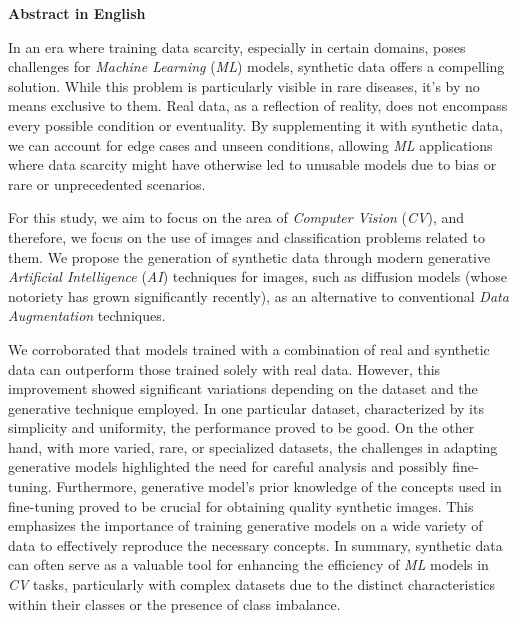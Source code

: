 \bigskip
\bigskip
\bigskip
{\huge\bfseries \space Abstract in English}
\bigskip
\bigskip

In an era where training data scarcity, especially in certain domains, poses challenges for \textit{Machine Learning} (\textit{ML}) models, synthetic data offers a compelling solution. While this problem is particularly visible in rare diseases, it's by no means exclusive to them. Real data, as a reflection of reality, does not encompass every possible condition or eventuality. By supplementing it with synthetic data, we can account for edge cases and unseen conditions, allowing \textit{ML} applications where data scarcity might have otherwise led to unusable models due to bias or rare or unprecedented scenarios.

For this study, we aim to focus on the area of \textit{Computer Vision} (\textit{CV}), and therefore, we focus on the use of images and classification problems related to them. We propose the generation of synthetic data through modern generative \textit{Artificial Intelligence} (\textit{AI}) techniques for images, such as diffusion models (whose notoriety has grown significantly recently), as an alternative to conventional \textit{Data Augmentation} techniques. 

We corroborated that models trained with a combination of real and synthetic data can outperform those trained solely with real data. However, this improvement showed significant variations depending on the dataset and the generative technique employed. In one particular dataset, characterized by its simplicity and uniformity, the performance proved to be good. On the other hand, with more varied, rare, or specialized datasets, the challenges in adapting generative models highlighted the need for careful analysis and possibly fine-tuning. Furthermore, generative model's prior knowledge of the concepts used in fine-tuning proved to be crucial for obtaining quality synthetic images. This emphasizes the importance of training generative models on a wide variety of data to effectively reproduce the necessary concepts. In summary, synthetic data can often serve as a valuable tool for enhancing the efficiency of \textit{ML} models in \textit{CV} tasks, particularly with complex datasets due to the distinct characteristics within their classes or the presence of class imbalance.



\newpage